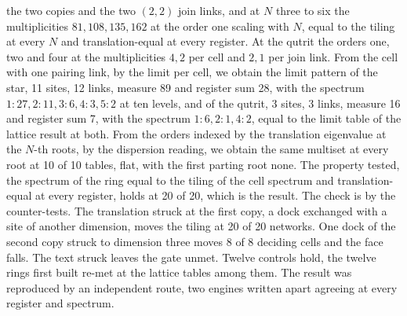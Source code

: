 \begin{chproof}[census]
the two copies and the two $(2,2)$ join links, and at $N$ three to six the multiplicities $81, 108, 135, 162$ at the order one scaling with $N$, equal to the tiling at every $N$ and translation-equal at every register. At the qutrit the orders one, two and four at the multiplicities $4, 2$ per cell and $2, 1$ per join link. From the cell with one pairing link, by the limit per cell, we obtain the limit pattern of the star, 11 sites, 12 links, measure 89 and register sum 28, with the spectrum $1\!:\!27, 2\!:\!11, 3\!:\!6, 4\!:\!3, 5\!:\!2$ at ten levels, and of the qutrit, 3 sites, 3 links, measure 16 and register sum 7, with the spectrum $1\!:\!6, 2\!:\!1, 4\!:\!2$, equal to the limit table of the lattice result at both. From the orders indexed by the translation eigenvalue at the $N$-th roots, by the dispersion reading, we obtain the same multiset at every root at 10 of 10 tables, flat, with the first parting root none. The property tested, the spectrum of the ring equal to the tiling of the cell spectrum and translation-equal at every register, holds at 20 of 20, which is the result.
The check is by the counter-tests. The translation struck at the first copy, a dock exchanged with a site of another dimension, moves the tiling at 20 of 20 networks. One dock of the second copy struck to dimension three moves 8 of 8 deciding cells and the face falls. The text struck leaves the gate unmet. Twelve controls hold, the twelve rings first built re-met at the lattice tables among them.
The result was reproduced by an independent route, two engines written apart agreeing at every register and spectrum.
\end{chproof}

\par\medskip{}\label{narr:close:12-2}\par
